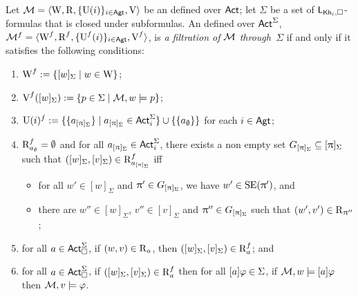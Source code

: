 \begin{definition} \label{def:filtrations}
Let $\mathcal{M} = \langle \operatorname{W},\operatorname{R}, \{ \operatorname{U}(i) \}_{i\in {\rm \sf Agt}}, \operatorname{V} \rangle$ be an \ults defined over ${\rm \sf Act}$; let $\Sigma$ be a set of $\mathsf{L}_{{\sf Kh}_i,\square}$-formulas that is closed under subformulas. An \ults defined over ${\rm \sf Act}^\Sigma$, $\mathcal{M}^f = \langle \operatorname{W}^f,\operatorname{R}^f, \{ \operatorname{U}^f(i) \}_{i\in {\rm \sf Agt}}, \operatorname{V}^f \rangle$, is \emph{a filtration of $\mathcal{M}$ through~$\Sigma$} if and only if it satisfies the following conditions:

\begin{enumerate}
\item $\operatorname{W}^f := \{ [w]_\Sigma \mid w \in \operatorname{W} \}$;
\item $\operatorname{V}^f([w]_\Sigma) := \{ p \in \Sigma \mid \mathcal{M},w\models p \}$;
\item $\operatorname{U}(i)^f := \{ \{ a_{[\uppi]_{\Sigma}} \} \mid a_{[\uppi]_{\Sigma}} \in {\rm \sf Act}^\Sigma_i \} \cup \{ \{ a_\emptyset \} \}$ for each $i \in {\rm \sf Agt}$;
\item \label{item:khiml-fil} $\operatorname{R}^f_{a_\emptyset} = \emptyset$ and for all $a_{[\uppi]_\Sigma} \in {\rm \sf Act}^\Sigma_i$, there exists a non empty set $G_{[\uppi]_\Sigma} \subseteq [\uppi]_\Sigma$ such that $([w]_\Sigma,[v]_\Sigma) \in \operatorname{R}^f_{a_{[\uppi]_\Sigma}}$ iff
\begin{itemize}
\item for all $w' \in [w]_\Sigma$ and $\uppi' \in G_{[\uppi]_\Sigma}$, we have $w' \in \operatorname{SE}(\uppi')$, and
\item there are $w'' \in [w]_\Sigma$, $v'' \in [v]_\Sigma$ and $\uppi'' \in G_{[\uppi]_\Sigma}$ such that $(w',v') \in \operatorname{R}_{\uppi''}$;
\end{itemize}
\item \label{item:khiml-fil-a1} for all $a \in {\rm \sf Act}^\Sigma_\square$, if $(w,v)\in\operatorname{R}_a$, then $([w]_\Sigma,[v]_\Sigma) \in \operatorname{R}^f_a$; and
\item \label{item:khiml-fil-a2} for all $a \in {\rm \sf Act}^\Sigma_\square$, if $([w]_\Sigma,[v]_\Sigma) \in \operatorname{R}^f_a$ then for all $[a] \varphi \in \Sigma$, if $\mathcal{M},w \models [a]\varphi$ then $\mathcal{M},v \models \varphi$.
\end{enumerate}
\end{definition}

\medskip

